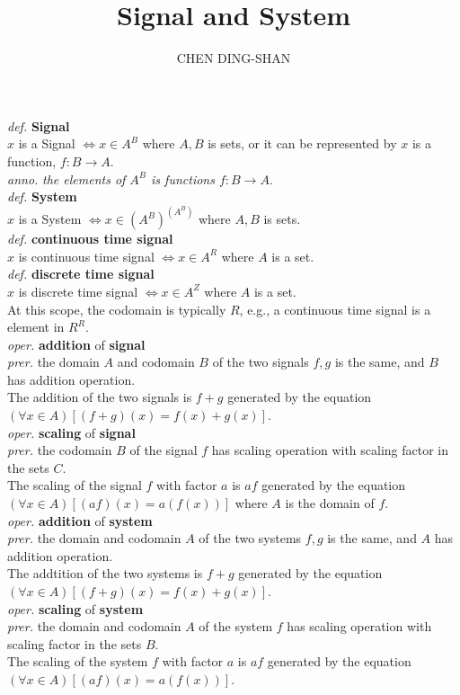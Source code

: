 \documentclass{article}
\title{Signal and System}
\author{CHEN DING-SHAN}
\date{}
\newcommand{\sd}[1]{{\left(#1\right)}}
\newcommand{\df}[1]{\emph{def.} \textbf{#1}}
\newcommand{\anno}[1]{\emph{anno.} \emph{#1}}
\newcommand{\md}[1]{{\left[#1\right]}}
\newcommand{\prer}[1]{\emph{prer.} #1}
\newcommand{\oper}[2]{\emph{oper.} \textbf{#1} of \textbf{#2}}
\begin{document}
\maketitle
\noindent
\df{Signal}\\
$x$ is a Signal $\iff x \in A^B$ where $A, B$ is sets, or it can be represented by $x$ is a function, $f:B \to A$.\\
\anno{the elements of $A^B$ is functions $f:B \to A$}.\\
\df{System}\\
$x$ is a System $\iff x \in \sd{A^B}^\sd{A^B}$ where $A, B$ is sets.\\
\df{continuous time signal}\\
$x$ is continuous time signal $\iff x \in A^R$ where $A$ is a set.\\
\df{discrete time signal}\\
$x$ is discrete time signal $\iff x \in A^Z$ where $A$ is a set.\\
At this scope, the codomain is typically $R$, e.g., a continuous time signal is a element in $R^R$.\\
\oper{addition}{signal}\\
\prer{the domain $A$ and codomain $B$ of the two signals $f,g$ is the same, and $B$ has addition operation.}\\
The addition of the two signals is $f+g$ generated by the equation $\sd{\forall x \in A}\md{\sd{f+g}\sd{x} = f\sd{x} + g\sd{x}}$.\\
\oper{scaling}{signal}\\
\prer{the codomain $B$ of the signal $f$ has scaling operation with scaling factor in the sets $C$.}\\
The scaling of the signal $f$ with factor $a$ is $af$ generated by the equation $\sd{\forall x \in A}\md{\sd{af}\sd{x} = a\sd{f\sd{x}}}$ where $A$ is the domain of $f$.\\
\oper{addition}{system}\\
\prer{the domain and codomain $A$ of the two systems $f,g$ is the same, and $A$ has addition operation.}\\
The addtition of the two systems is $f+g$ generated by the equation $\sd{\forall x \in A}\md{\sd{f+g}\sd{x} = f\sd{x} + g\sd{x}}$.\\
\oper{scaling}{system}\\
\prer{the domain and codomain $A$ of the system $f$ has scaling operation with scaling factor in the sets $B$.}\\
The scaling of the system $f$ with factor $a$ is $af$ generated by the equation $\sd{\forall x \in A}\md{\sd{af}\sd{x} = a\sd{f\sd{x}}}$.\\
\end{document}
